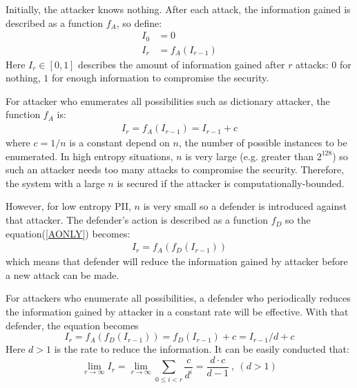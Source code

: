 \documentclass[10pt, conference, compsocconf]{IEEEtran}
\begin{document}
        Initially, the attacker knows nothing. After
        each attack, the information gained
        is described as a function $f_A$, so define:
        \begin{align}
            I_0 &= 0\\
            I_r &= f_A(I_{r-1})\label{AONLY}
        \end{align}
        Here $I_r \in [0, 1]$ describes the amount of information
        gained after $r$ attacks: $0$ for nothing, $1$ for enough
        information to compromise the security.

        For attacker who enumerates all possibilities such
        as dictionary attacker, the
        function $f_A$ is:
        \begin{align}
            I_r = f_A(I_{r-1}) = I_{r-1}+c\label{AONLYE}
        \end{align}
        where $c = 1/n$ is a constant depend on $n$,
        the number of possible instances to be enumerated.
        In high entropy situations, $n$ is very large (e.g. greater than $2^{128}$)
         so such an attacker needs too many
        attacks to compromise the security. Therefore, the system with
        a large $n$ is secured if the attacker is computationally-bounded.

        However, for low entropy PII, $n$ is very small so
        a defender is introduced against that attacker.
        The defender's action is described as a function $f_D$
        so the equation(\ref{AONLY}) becomes:
        \begin{align}
            I_r = f_A(f_D(I_{r-1}))
        \end{align}
        which means that defender will reduce the information
        gained by attacker before a new attack can be made.

        For attackers who enumerate all possibilities,
        a defender
        who periodically reduces the information gained by
        attacker in a constant rate will be effective. With
        that defender,
        the equation becomes
        \begin{equation}
            I_r = f_A(f_D(I_{r-1})) = f_D(I_{r-1})+c = I_{r-1}/d+c
        \end{equation}
        Here $d > 1$ is the rate to reduce the information.
        It can be easily conducted that:
        \begin{equation*}
            \lim_{r \rightarrow \infty} I_r = \lim_{r \rightarrow \infty} \sum_{0 \leq i < r} \frac{c}{d^i}
                = \frac{d \cdot c}{d-1}~, ~(d > 1)
        \end{equation*}
\end{document}

